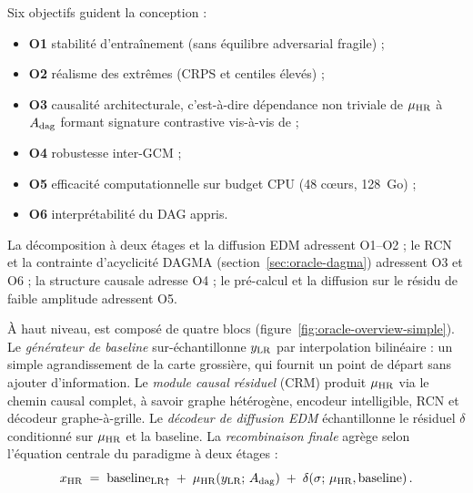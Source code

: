Six objectifs guident la conception :
\begin{itemize}[leftmargin=1.2em, itemsep=2pt]
    \item \textbf{O1} stabilité d'entraînement (sans équilibre adversarial fragile) ;
    \item \textbf{O2} réalisme des extrêmes (CRPS et centiles élevés) ;
    \item \textbf{O3} causalité architecturale, c'est-à-dire dépendance non triviale de $\mu_{\text{HR}}$ à $A_{\mathrm{dag}}$ formant signature contrastive vis-à-vis de \CorrDiff{} ;
    \item \textbf{O4} robustesse inter-GCM ;
    \item \textbf{O5} efficacité computationnelle sur budget CPU (48 cœurs, 128~Go) ;
    \item \textbf{O6} interprétabilité du DAG appris.
\end{itemize}
La décomposition à deux étages et la diffusion EDM adressent O1--O2 ; le RCN et la contrainte d'acyclicité DAGMA (section~\ref{sec:oracle-dagma}) adressent O3 et O6 ; la structure causale adresse O4 ; le pré-calcul et la diffusion sur le résidu de faible amplitude adressent O5.

\label{sec:oracle-overview}

À haut niveau, \Oracle{} est composé de quatre blocs (figure~\ref{fig:oracle-overview-simple}). Le \emph{générateur de baseline} sur-échantillonne $y_{\text{LR}}$ par interpolation bilinéaire : un simple agrandissement de la carte grossière, qui fournit un point de départ sans ajouter d'information. Le \emph{module causal résiduel} (CRM) produit $\mu_{\text{HR}}$ via le chemin causal complet, à savoir graphe hétérogène, encodeur intelligible, RCN et décodeur graphe-à-grille. Le \emph{décodeur de diffusion EDM} échantillonne le résiduel $\delta$ conditionné sur $\mu_{\text{HR}}$ et la baseline. La \emph{recombinaison finale} agrège selon l'équation centrale du paradigme à deux étages :
\begin{equation}
  x_{\text{HR}} \;=\; \mathrm{baseline}_{\text{LR} \uparrow} \;+\; \mu_{\text{HR}}\!\left(y_{\text{LR}};\, A_{\mathrm{dag}}\right) \;+\; \delta\!\left(\sigma;\, \mu_{\text{HR}}, \mathrm{baseline}\right).
  \label{eq:oracle-decomposition}
\end{equation}

